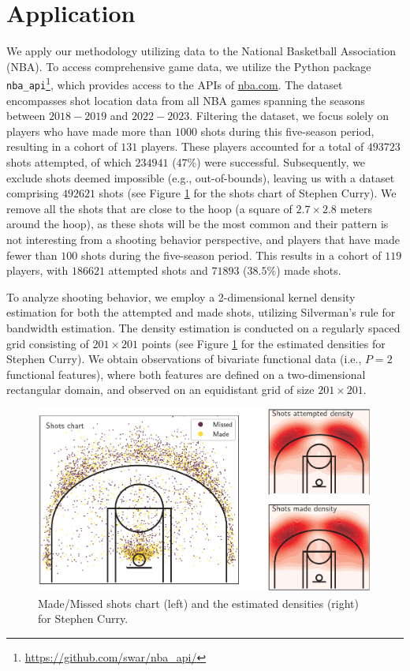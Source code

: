 
\section{Application} %
\label{sec:application}

We apply our methodology utilizing data to the National Basketball Association (NBA). To access comprehensive game data, we utilize the Python package \texttt{nba\_api}\footnote{\url{https://github.com/swar/nba_api/}}, which provides access to the APIs of \url{nba.com}. The dataset encompasses shot location data from all NBA games spanning the seasons between $2018-2019$ and $2022-2023$. Filtering the dataset, we focus solely on players who have made more than $1000$ shots during this five-season period, resulting in a cohort of $131$ players. These players accounted for a total of $493723$ shots attempted, of which $234941$ ($47\%$) were successful. Subsequently, we exclude shots deemed impossible (e.g., out-of-bounds), leaving us with a dataset comprising $492621$ shots (see Figure \ref{fig:shoots_make_miss} for the shots chart of Stephen Curry). We remove all the shots that are close to the hoop (a square of $2.7 \times 2.8$ meters around the hoop), as these shots will be the most common and their pattern is not interesting from a shooting behavior perspective, and players that have made fewer than $100$ shots during the five-season period. This results in a cohort of $119$ players, with $186621$ attempted shots and $71893$ ($38.5\%$) made shots.

To analyze shooting behavior, we employ a 2-dimensional kernel density estimation for both the attempted and made shots, utilizing Silverman's rule \citep{silvermanDensityEstimationStatistics1986} for bandwidth estimation. The density estimation is conducted on a regularly spaced grid consisting of $201 \times 201$ points (see Figure \ref{fig:shoots_make_miss} for the estimated densities for Stephen Curry). We obtain observations of bivariate functional data (i.e., $P = 2$ functional features), where both features are defined on a two-dimensional rectangular domain, and observed on an equidistant grid of size $201 \times 201$.
\begin{figure}
    \centering
    \includegraphics[width=\textwidth]{figures/curry}
    \caption{Made/Missed shots chart (left) and the estimated densities (right) for Stephen Curry.}
    \label{fig:shoots_make_miss}
\end{figure}


